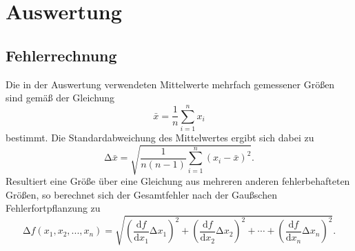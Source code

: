 \documentclass[
  bibliography=totoc,     %
  captions=tableheading,  %
  titlepage=firstiscover, %
]{scrartcl}
\begin{document}
\section{Auswertung}
\label{sec:auswertung}
\subsection{Fehlerrechnung}
Die in der Auswertung verwendeten Mittelwerte mehrfach gemessener Größen sind
gemäß der Gleichung
\begin{equation}
    \bar{x}=\frac{1}{n}\sum_{i=1}^n x_i
    \label{eqn:formel6}
\end{equation}
bestimmt. Die Standardabweichung des Mittelwertes ergibt sich dabei zu
\begin{equation}
    \mathup{\Delta}\bar{x}=\sqrt{\frac{1}{n(n-1)}\sum_{i=1}^n\left(x_i-\bar{x}\right)^2}.
    \label{eqn:formel7}
\end{equation}
Resultiert eine Größe über eine Gleichung aus mehreren anderen fehlerbehafteten
Größen, so berechnet sich der Gesamtfehler nach der Gaußschen
Fehlerfortpflanzung zu
\begin{equation}
    \mathup{\Delta}f(x_1,x_2,...,x_n)=\sqrt{\left(\frac{\mathup{d}f}{\mathup{d}x_1}\mathup{\Delta}x_1\right)^2+\left(\frac{\mathup{d}f}{\mathup{d}x_2}\mathup{\Delta}x_2\right)^2+ \dotsb +\left(\frac{\mathup{d}f}{\mathup{d}x_n}\mathup{\Delta}x_n\right)^2}.
    \label{eqn:formel8}
\end{equation}
\end{document}

